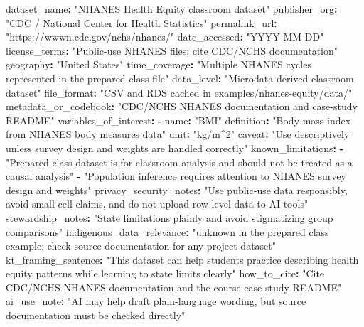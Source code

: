 \documentclass[
  letterpaper,
  DIV=11,
  numbers=noendperiod,
  oneside]{scrreprt}
\newenvironment{Shaded}{\begin{snugshade}}{\end{snugshade}}
\newcommand{\AttributeTok}[1]{\textcolor[rgb]{0.40,0.45,0.13}{#1}}
\newcommand{\FunctionTok}[1]{\textcolor[rgb]{0.28,0.35,0.67}{#1}}
\newcommand{\KeywordTok}[1]{\textcolor[rgb]{0.00,0.23,0.31}{\textbf{#1}}}
\newcommand{\StringTok}[1]{\textcolor[rgb]{0.13,0.47,0.30}{#1}}
\begin{document}

\begin{Shaded}
\begin{Highlighting}[numbers=left,,]
\FunctionTok{dataset\_name}\KeywordTok{:}\AttributeTok{ }\StringTok{"NHANES Health Equity classroom dataset"}
\FunctionTok{publisher\_org}\KeywordTok{:}\AttributeTok{ }\StringTok{"CDC / National Center for Health Statistics"}
\FunctionTok{permalink\_url}\KeywordTok{:}\AttributeTok{ }\StringTok{"https://wwwn.cdc.gov/nchs/nhanes/"}
\FunctionTok{date\_accessed}\KeywordTok{:}\AttributeTok{ }\StringTok{"YYYY{-}MM{-}DD"}
\FunctionTok{license\_terms}\KeywordTok{:}\AttributeTok{ }\StringTok{"Public{-}use NHANES files; cite CDC/NCHS documentation"}
\FunctionTok{geography}\KeywordTok{:}\AttributeTok{ }\StringTok{"United States"}
\FunctionTok{time\_coverage}\KeywordTok{:}\AttributeTok{ }\StringTok{"Multiple NHANES cycles represented in the prepared class file"}
\FunctionTok{data\_level}\KeywordTok{:}\AttributeTok{ }\StringTok{"Microdata{-}derived classroom dataset"}
\FunctionTok{file\_format}\KeywordTok{:}\AttributeTok{ }\StringTok{"CSV and RDS cached in examples/nhanes{-}equity/data/"}
\FunctionTok{metadata\_or\_codebook}\KeywordTok{:}\AttributeTok{ }\StringTok{"CDC/NCHS NHANES documentation and case{-}study README"}
\FunctionTok{variables\_of\_interest}\KeywordTok{:}
\AttributeTok{  }\KeywordTok{{-}}\AttributeTok{ }\FunctionTok{name}\KeywordTok{:}\AttributeTok{ }\StringTok{"BMI"}
\AttributeTok{    }\FunctionTok{definition}\KeywordTok{:}\AttributeTok{ }\StringTok{"Body mass index from NHANES body measures data"}
\AttributeTok{    }\FunctionTok{unit}\KeywordTok{:}\AttributeTok{ }\StringTok{"kg/m\^{}2"}
\AttributeTok{    }\FunctionTok{caveat}\KeywordTok{:}\AttributeTok{ }\StringTok{"Use descriptively unless survey design and weights are handled correctly"}
\FunctionTok{known\_limitations}\KeywordTok{:}
\AttributeTok{  }\KeywordTok{{-}}\AttributeTok{ }\StringTok{"Prepared class dataset is for classroom analysis and should not be treated as a causal analysis"}
\AttributeTok{  }\KeywordTok{{-}}\AttributeTok{ }\StringTok{"Population inference requires attention to NHANES survey design and weights"}
\FunctionTok{privacy\_security\_notes}\KeywordTok{:}\AttributeTok{ }\StringTok{"Use public{-}use data responsibly, avoid small{-}cell claims, and do not upload row{-}level data to AI tools"}
\FunctionTok{stewardship\_notes}\KeywordTok{:}\AttributeTok{ }\StringTok{"State limitations plainly and avoid stigmatizing group comparisons"}
\FunctionTok{indigenous\_data\_relevance}\KeywordTok{:}\AttributeTok{ }\StringTok{"unknown in the prepared class example; check source documentation for any project dataset"}
\FunctionTok{kt\_framing\_sentence}\KeywordTok{:}\AttributeTok{ }\StringTok{"This dataset can help students practice describing health equity patterns while learning to state limits clearly"}
\FunctionTok{how\_to\_cite}\KeywordTok{:}\AttributeTok{ }\StringTok{"Cite CDC/NCHS NHANES documentation and the course case{-}study README"}
\FunctionTok{ai\_use\_note}\KeywordTok{:}\AttributeTok{ }\StringTok{"AI may help draft plain{-}language wording, but source documentation must be checked directly"}
\end{Highlighting}
\end{Shaded}
\end{document}
